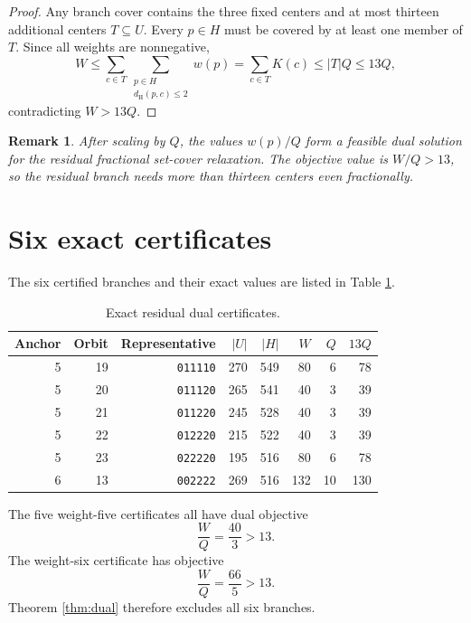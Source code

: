\documentclass[11pt]{article}
\newtheorem{remark}[theorem]{Remark}
\newcommand{\dist}{d_{\mathrm H}}
\newcommand{\codeword}[1]{\texttt{#1}}
\begin{document}
\begin{proof}
Any branch cover contains the three fixed centers and at most thirteen
additional centers \(T\subseteq U\).  Every \(p\in H\) must be covered by
at least one member of \(T\).  Since all weights are nonnegative,
\[
  W
  \leq
  \sum_{c\in T}
  \sum_{\substack{p\in H\\\dist(p,c)\leq2}}w(p)
  =
  \sum_{c\in T}K(c)
  \leq
  |T|Q
  \leq
  13Q,
\]
contradicting \(W>13Q\).
\end{proof}

\begin{remark}
After scaling by \(Q\), the values \(w(p)/Q\) form a feasible dual solution
for the residual fractional set-cover relaxation.  The objective value is
\(W/Q>13\), so the residual branch needs more than thirteen centers even
fractionally.
\end{remark}

\section{Six exact certificates}

The six certified branches and their exact values are listed in Table
\ref{tab:certificates}.

\begin{table}[htbp]
\centering
\caption{Exact residual dual certificates.}
\label{tab:certificates}
\begin{tabular}{rrrrrrrr}
\toprule
Anchor & Orbit & Representative & \(|U|\) & \(|H|\) & \(W\) & \(Q\) & \(13Q\)\\
\midrule
5 & 19 & \codeword{011110} & 270 & 549 & 80 & 6 & 78\\
5 & 20 & \codeword{011120} & 265 & 541 & 40 & 3 & 39\\
5 & 21 & \codeword{011220} & 245 & 528 & 40 & 3 & 39\\
5 & 22 & \codeword{012220} & 215 & 522 & 40 & 3 & 39\\
5 & 23 & \codeword{022220} & 195 & 516 & 80 & 6 & 78\\
6 & 13 & \codeword{002222} & 269 & 516 & 132 & 10 & 130\\
\bottomrule
\end{tabular}
\end{table}

The five weight-five certificates all have dual objective
\[
  \frac{W}{Q}=\frac{40}{3}>13.
\]
The weight-six certificate has objective
\[
  \frac{W}{Q}=\frac{66}{5}>13.
\]
Theorem \ref{thm:dual} therefore excludes all six branches.
\end{document}
